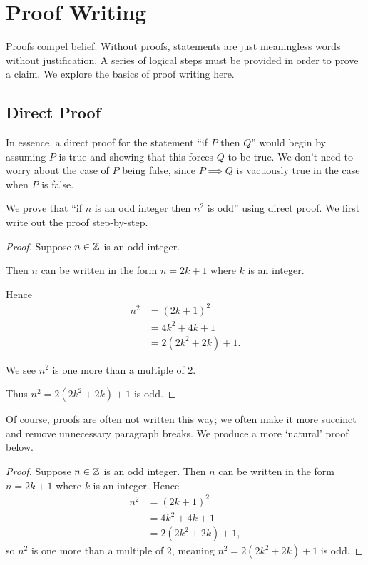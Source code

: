 \chapter{Proof Writing}
Proofs compel belief. Without proofs, statements are just meaningless words without justification. A series of logical steps must be provided in order to prove a claim. We explore the basics of proof writing here.

\section{Direct Proof}
In essence, a direct proof for the statement ``if $P$ then $Q$'' would begin by assuming $P$ is true and showing that this forces $Q$ to be true. We don't need to worry about the case of $P$ being false, since $P \implies Q$ is vacuously true in the case when $P$ is false.
\begin{example}
    We prove that ``if $n$ is an odd integer then $n^2$ is odd'' using direct proof. We first write out the proof step-by-step.
    \begin{proof}
        Suppose $n\in\mathbb{Z}$ is an odd integer.

        Then $n$ can be written in the form $n = 2k + 1$ where $k$ is an integer.

        Hence
        \begin{align*}
            n^2 &= (2k+1)^2\\
            &= 4k^2 + 4k + 1\\
            &= 2(2k^2 + 2k) + 1.
        \end{align*}

        We see $n^2$ is one more than a multiple of 2.

        Thus $n^2 = 2(2k^2 + 2k) + 1$ is odd.
    \end{proof}

    Of course, proofs are often not written this way; we often make it more succinct and remove unnecessary paragraph breaks. We produce a more `natural' proof below.
    \begin{proof}
        Suppose $n\in\mathbb{Z}$ is an odd integer. Then $n$ can be written in the form $n = 2k + 1$ where $k$ is an integer. Hence
        \begin{align*}
            n^2 &= (2k+1)^2\\
            &= 4k^2 + 4k + 1\\
            &= 2(2k^2 + 2k) + 1,
        \end{align*}
        so $n^2$ is one more than a multiple of 2, meaning $n^2 = 2(2k^2 + 2k) + 1$ is odd.
    \end{proof}
\end{example}
